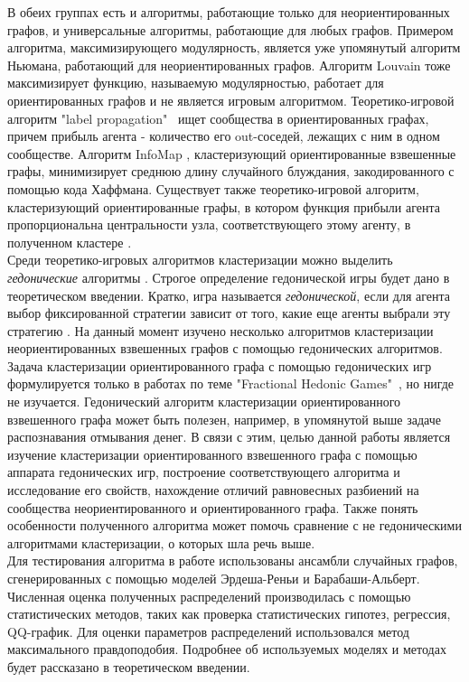 В обеих группах есть и алгоритмы, работающие только для неориентированных графов, и универсальные алгоритмы, работающие для любых графов. Примером алгоритма, максимизирующего модулярность, является уже упомянутый алгоритм Ньюмана, работающий для неориентированных графов. Алгоритм Louvain тоже максимизирует функцию, называемую модулярностью, работает для ориентированных графов и не является игровым алгоритмом. Теоретико-игровой алгоритм "label propagation"\ \cite{Raghavan} ищет сообщества в ориентированных графах, причем прибыль агента - количество его out-соседей, лежащих с ним в одном сообществе. Алгоритм InfoMap \cite{infomap}, кластеризующий ориентированные взвешенные графы, минимизирует среднюю длину случайного блуждания, закодированного с помощью кода Хаффмана. Существует также теоретико-игровой алгоритм, кластеризующий ориентированные графы, в котором функция прибыли агента пропорциональна центральности узла, соответствующего этому агенту, в полученном кластере \cite{Balliu}.\\

Среди теоретико-игровых алгоритмов кластеризации можно выделить \textit{гедонические} алгоритмы \cite{clusteringhg}. Строгое определение гедонической игры будет дано в теоретическом введении. Кратко, игра называется \textit{гедонической}, если для агента выбор фиксированной стратегии зависит от того, какие еще агенты выбрали эту стратегию \cite{framework}. На данный момент изучено несколько алгоритмов кластеризации неориентированных взвешенных графов \cite{clusteringhg} с помощью гедонических алгоритмов. Задача кластеризации ориентированного графа с помощью гедонических игр формулируется только в работах по теме "Fractional Hedonic Games"\ \cite{fhg2017}, но нигде не изучается. Гедонический алгоритм кластеризации ориентированного взвешенного графа может быть полезен, например, в упомянутой выше задаче распознавания отмывания денег. В связи с этим, целью данной работы является изучение кластеризации ориентированного взвешенного графа с помощью аппарата гедонических игр, построение соответствующего алгоритма и исследование его свойств, нахождение отличий равновесных разбиений на сообщества неориентированного и ориентированного графа. Также понять особенности полученного алгоритма может помочь сравнение с не гедоническими алгоритмами кластеризации, о которых шла речь выше.\\

Для тестирования алгоритма в работе использованы ансамбли случайных графов, сгенерированных с помощью моделей Эрдеша-Реньи и Барабаши-Альберт. Численная оценка полученных распределений производилась с помощью статистических методов, таких как проверка статистических гипотез, регрессия, QQ-график. Для оценки параметров распределений использовался метод максимального правдоподобия. Подробнее об используемых моделях и методах будет рассказано в теоретическом введении. 